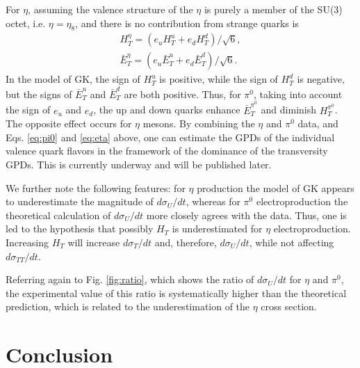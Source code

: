 \documentclass[prc,aps,floatfix,showpacs,showkeys,twocolumn,superscriptaddress,letterpaper,10pt]{revtex4-1}
\begin{document}
For $\eta$, assuming the valence structure of the $\eta$ is purely a member of the SU(3) octet, i.e. $\eta = \eta_8$,
and there is no contribution from strange quarks is
\begin{equation}   \label{eq:eta}
\begin{split}
 H_T^{\eta} =(e_u H_T^u +e_d  H_T^d) /{\sqrt{6}} ,\\
 \bar E_T^{\eta} =(e_u \bar E_T^{u} + e_d  \bar E_T^{d}) / {\sqrt{6}}.
\end{split}
\end{equation}
\noindent
In the model of GK, the sign of  $H_T^u$ is positive, while the sign of $H_T^d$ is negative, but the signs of $\bar E_T^{u}$ and 
$\bar E_T^{d}$ are both positive.  Thus, for  $\pi^0$,  taking into account the sign of $e_u$ and $e_d$, the up and down quarks enhance $\bar E_T^{\pi^0}$ and diminish $H_{T}^{\pi^0}$.
The opposite effect occurs for  $\eta$ mesons. 
By combining the  $\eta$ and $\pi^0$ data, and Eqs. \ref{eq:pi0} and \ref{eq:eta} above, one can estimate the GPDs of the individual valence quark flavors in the framework of the dominance of the transversity GPDs. This is currently underway and will be published later.


We further note the following  features:
for $\eta$ production the model of GK appears to underestimate the magnitude of $d\sigma_{U}/dt$, whereas for $\pi^0$ electroproduction the  theoretical calculation of $d\sigma_{U}/dt$ more closely agrees with the data. Thus, one is led to the hypothesis that possibly $H_T$  is underestimated for $\eta$ electroproduction. Increasing $H_T$ will increase $d\sigma_{T}/dt$ and, therefore, $d\sigma_{U}/dt$, while not affecting $d\sigma_{TT}/dt$.




Referring again to Fig. \ref{fig:ratio}, which shows the ratio of $d\sigma_U/dt$ for $\eta$ and $\pi^0$, the experimental value of this ratio is systematically higher than the theoretical prediction, which is related to the underestimation of the $\eta$ cross section.





\section{Conclusion}
\end{document}
